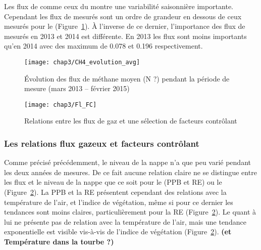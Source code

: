 
Les flux de \chh comme ceux du \coo montre une variabilité saisonnière importante.
Cependant les flux de \chh mesurés sont un ordre de grandeur en dessous de ceux mesurés pour le \coo (Figure~\ref{fig:CH4_evolution_avg}).
À l'inverse de ce dernier, l'importance des flux de \chh mesurés en 2013 et 2014 est différente.
En 2013 les flux sont moins importants qu'en 2014 avec des maximum de \num{0.078} et \SI{0.196}{\uml} respectivement.

\begin{figure}
\centering
\texttt{[image: chap3/CH4\_evolution\_avg]}
\caption{Évolution des flux de méthane moyen (N ?) pendant la période de mesure (mars 2013 -- février 2015)}
\label{fig:CH4_evolution_avg}
\end{figure}

\begin{figure}
\centering
\texttt{[image: chap3/Fl\_FC]}
\caption{Relations entre les flux de gaz et une sélection de facteurs contrôlant}
\label{fig:Fl_FC}
\end{figure}

\subsubsection{Les relations flux gazeux et facteurs contrôlant}

Comme précisé précédemment, le niveau de la nappe n'a que peu varié pendant les deux années de mesures.
De ce fait aucune relation claire ne se distingue entre les flux et le niveau de la nappe que ce soit pour le \coo (PPB et RE) ou le \chh (Figure~\ref{fig:Fl_FC}).
La PPB et la RE présentent cependant des relations avec la température de l'air, et l'indice de végétation, même si pour ce dernier les tendances sont moins claires, particulièrement pour la RE (Figure~\ref{fig:Fl_FC}).
Le \chh quant à lui ne présente pas de relation avec la température de l'air, mais une tendance exponentielle est visible vis-à-vis de l'indice de végétation (Figure~\ref{fig:Fl_FC}).
\textbf{(\chh et Température dans la tourbe ?)}

